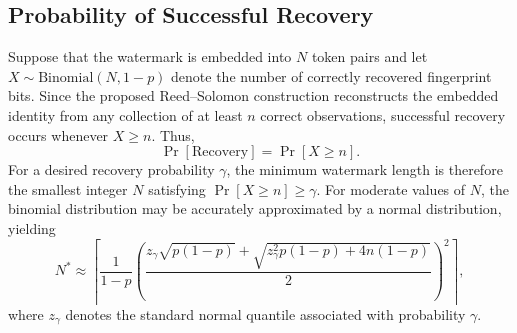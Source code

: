\documentclass[a4paper,11pt]{llncs}
\begin{document}
\subsection{Probability of Successful Recovery}

Suppose that the watermark is embedded into $N$ token pairs and let
$X\sim\mathrm{Binomial}(N,1-p)$
denote the number of correctly recovered fingerprint bits.
Since the proposed Reed--Solomon construction reconstructs the embedded
identity from any collection of at least $n$ correct observations,
successful recovery occurs whenever $X\ge n$. Thus,
\[
\Pr[\mathrm{Recovery}]
=
\Pr[X\ge n].
\]
For a desired recovery probability $\gamma$, the minimum watermark length
is therefore the smallest integer $N$ satisfying
$\Pr[X\ge n]\ge\gamma.$
For moderate values of $N$, the binomial distribution may be accurately
approximated by a normal distribution, yielding
\[
N^*
\approx
\left\lceil
\frac{1}{1-p}
\left(
\frac{
z_\gamma\sqrt{p(1-p)}
+
\sqrt{
z_\gamma^2p(1-p)+4n(1-p)
}
}{2}
\right)^2
\right\rceil,
\]
where $z_\gamma$ denotes the standard normal quantile associated with
probability $\gamma$.
\end{document}
